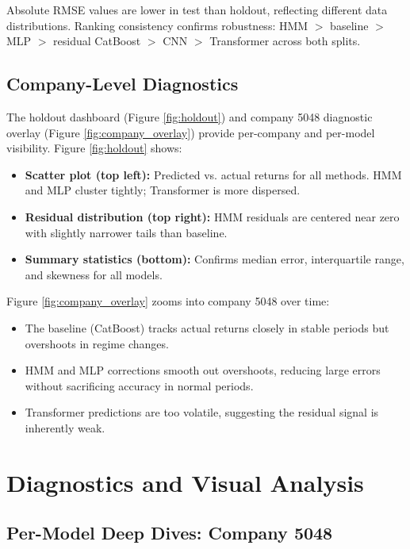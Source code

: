 \documentclass[11pt]{article}
\begin{document}
Absolute RMSE values are lower in test than holdout, reflecting different data distributions. Ranking consistency confirms robustness: HMM $>$ baseline $>$ MLP $>$ residual CatBoost $>$ CNN $>$ Transformer across both splits.

\subsection{Company-Level Diagnostics}
The holdout dashboard (Figure \ref{fig:holdout}) and company 5048 diagnostic overlay (Figure \ref{fig:company_overlay}) provide per-company and per-model visibility. Figure \ref{fig:holdout} shows:
\begin{itemize}[leftmargin=1.2em]
    \item \textbf{Scatter plot (top left):} Predicted vs. actual returns for all methods. HMM and MLP cluster tightly; Transformer is more dispersed.
    \item \textbf{Residual distribution (top right):} HMM residuals are centered near zero with slightly narrower tails than baseline.
    \item \textbf{Summary statistics (bottom):} Confirms median error, interquartile range, and skewness for all models.
\end{itemize}

Figure \ref{fig:company_overlay} zooms into company 5048 over time:
\begin{itemize}[leftmargin=1.2em]
    \item The baseline (CatBoost) tracks actual returns closely in stable periods but overshoots in regime changes.
    \item HMM and MLP corrections smooth out overshoots, reducing large errors without sacrificing accuracy in normal periods.
    \item Transformer predictions are too volatile, suggesting the residual signal is inherently weak.
\end{itemize}

\section{Diagnostics and Visual Analysis}





\subsection{Per-Model Deep Dives: Company 5048}
\end{document}
